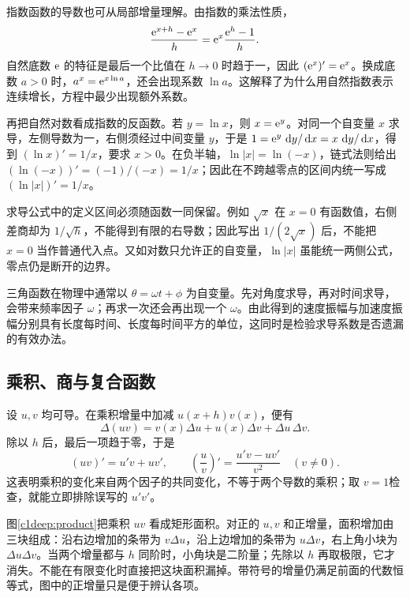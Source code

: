 指数函数的导数也可从局部增量理解。由指数的乘法性质，
\[
 \frac{\mathrm e^{x+h}-\mathrm e^x}{h}
 =\mathrm e^x\frac{\mathrm e^h-1}{h}.
\]
自然底数 $\mathrm e$ 的特征是最后一个比值在 $h\to0$ 时趋于一，因此 $(\mathrm e^x)'=\mathrm e^x$。换成底数 $a>0$ 时，$a^x=\mathrm e^{x\ln a}$，还会出现系数 $\ln a$。这解释了为什么用自然指数表示连续增长，方程中最少出现额外系数。

再把自然对数看成指数的反函数。若 $y=\ln x$，则 $x=\mathrm e^y$。对同一个自变量 $x$ 求导，左侧导数为一，右侧须经过中间变量 $y$，于是
$1=\mathrm e^y\,\mathop{}\!\mathrm d y/\mathop{}\!\mathrm d x=x\,\mathop{}\!\mathrm d y/\mathop{}\!\mathrm d x$，得到 $(\ln x)'=1/x$，要求 $x>0$。在负半轴，$\ln|x|=\ln(-x)$，链式法则给出 $(\ln(-x))'=(-1)/(-x)=1/x$；因此在不跨越零点的区间内统一写成 $(\ln|x|)'=1/x$。

求导公式中的定义区间必须随函数一同保留。例如 $\sqrt{x}$ 在 $x=0$ 有函数值，右侧差商却为 $1/\sqrt h$，不能得到有限的右导数；因此写出 $1/(2\sqrt x)$ 后，不能把 $x=0$ 当作普通代入点。又如对数只允许正的自变量，$\ln|x|$ 虽能统一两侧公式，零点仍是断开的边界。

三角函数在物理中通常以 $\theta=\omega t+\phi$ 为自变量。先对角度求导，再对时间求导，会带来频率因子 $\omega$；再求一次还会再出现一个 $\omega$。由此得到的速度振幅与加速度振幅分别具有长度每时间、长度每时间平方的单位，这同时是检验求导系数是否遗漏的有效办法。

\subsection{乘积、商与复合函数}
设 $u,v$ 均可导。在乘积增量中加减 $u(x+h)v(x)$，便有
\[
 \Delta(uv)=v(x)\Delta u+u(x)\Delta v+\Delta u\,\Delta v.
\]
除以 $h$ 后，最后一项趋于零，于是
\[
 (uv)'=u'v+uv',\qquad
 \left(\frac uv\right)'=\frac{u'v-uv'}{v^2}\quad(v\ne0).
\]
这表明乘积的变化来自两个因子的共同变化，不等于两个导数的乘积；取 $v=1$检查，就能立即排除误写的 $u'v'$。


图\ref{c1deep:product}把乘积 $uv$ 看成矩形面积。对正的 $u,v$ 和正增量，面积增加由三块组成：沿右边增加的条带为 $v\Delta u$，沿上边增加的条带为 $u\Delta v$，右上角小块为 $\Delta u\Delta v$。当两个增量都与 $h$ 同阶时，小角块是二阶量；先除以 $h$ 再取极限，它才消失。不能在有限变化时直接把这块面积漏掉。带符号的增量仍满足前面的代数恒等式，图中的正增量只是便于辨认各项。


